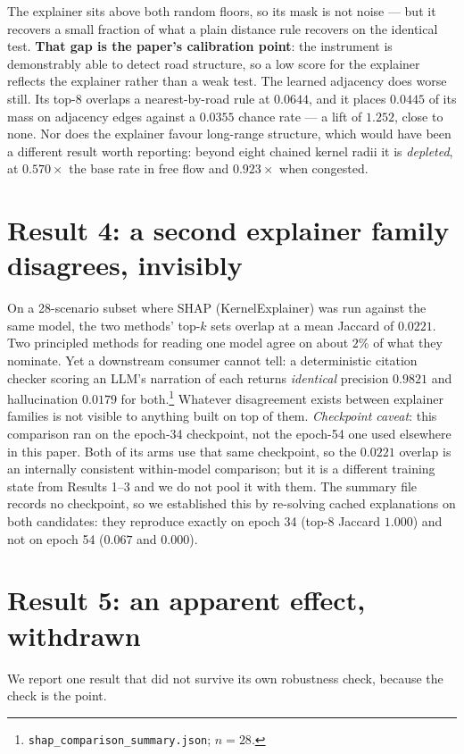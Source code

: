 \documentclass{article}
\begin{document}
The explainer sits above both random floors, so its mask is not noise --- but it
recovers a small fraction of what a plain distance rule recovers on the identical
test. \textbf{That gap is the paper's calibration point}: the instrument is
demonstrably able to detect road structure, so a low score for the explainer reflects
the explainer rather than a weak test. The learned adjacency does worse still. Its
top-8 overlaps a nearest-by-road rule at $0.0644$, and it places $0.0445$ of its mass
on adjacency edges against a $0.0355$ chance rate --- a lift of $1.252$, close to
none. Nor does the explainer favour long-range structure, which would have been a
different result worth reporting: beyond eight chained kernel radii it is
\emph{depleted}, at $0.570\times$ the base rate in free flow and $0.923\times$ when
congested.

\section{Result 4: a second explainer family disagrees, invisibly}

On a 28-scenario subset where SHAP (KernelExplainer) was run against the same model,
the two methods' top-$k$ sets overlap at a mean Jaccard of $0.0221$. Two principled
methods for reading one model agree on about $2\%$ of what they nominate. Yet a
downstream consumer cannot tell: a deterministic citation checker scoring an LLM's
narration of each returns \emph{identical} precision $0.9821$ and hallucination
$0.0179$ for both.\footnote{\texttt{shap\_comparison\_summary.json}; $n{=}28$.} Whatever
disagreement exists between explainer families is not visible to anything built on
top of them. \emph{Checkpoint caveat}: this comparison ran on the epoch-34 checkpoint,
not the epoch-54 one used elsewhere in this paper. Both of its arms use
that same checkpoint, so the $0.0221$ overlap is an internally consistent
within-model comparison; but it is a different training state from Results 1--3 and
we do not pool it with them. The summary file records no checkpoint, so we
established this by re-solving cached explanations on both candidates: they
reproduce exactly on epoch 34 (top-8 Jaccard $1.000$) and not on epoch 54
($0.067$ and $0.000$).

\section{Result 5: an apparent effect, withdrawn}

We report one result that did not survive its own robustness check, because the
check is the point.
\end{document}
